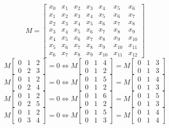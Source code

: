 $$ M = \left[\begin{matrix}x_{0} & x_{1} & x_{2} & x_{3} & x_{4} & x_{5} & x_{6}\\x_{1} & x_{2} & x_{3} & x_{4} & x_{5} & x_{6} & x_{7}\\x_{2} & x_{3} & x_{4} & x_{5} & x_{6} & x_{7} & x_{8}\\x_{3} & x_{4} & x_{5} & x_{6} & x_{7} & x_{8} & x_{9}\\x_{4} & x_{5} & x_{6} & x_{7} & x_{8} & x_{9} & x_{10}\\x_{5} & x_{6} & x_{7} & x_{8} & x_{9} & x_{10} & x_{11}\\x_{6} & x_{7} & x_{8} & x_{9} & x_{10} & x_{11} & x_{12}\end{matrix}\right] $$
$$ M\left[\begin{matrix}0 & 1 & 2\\0 & 2 & 3\end{matrix}\right] = 0 \Leftrightarrow M\left[\begin{matrix}0 & 1 & 4\\0 & 1 & 2\end{matrix}\right] = M\left[\begin{matrix}0 & 1 & 3\\0 & 1 & 3\end{matrix}\right] $$
$$ M\left[\begin{matrix}0 & 1 & 2\\0 & 2 & 4\end{matrix}\right] = 0 \Leftrightarrow M\left[\begin{matrix}0 & 1 & 5\\0 & 1 & 2\end{matrix}\right] = M\left[\begin{matrix}0 & 1 & 4\\0 & 1 & 3\end{matrix}\right] $$
$$ M\left[\begin{matrix}0 & 1 & 2\\0 & 2 & 5\end{matrix}\right] = 0 \Leftrightarrow M\left[\begin{matrix}0 & 1 & 6\\0 & 1 & 2\end{matrix}\right] = M\left[\begin{matrix}0 & 1 & 5\\0 & 1 & 3\end{matrix}\right] $$
$$ M\left[\begin{matrix}0 & 1 & 2\\0 & 3 & 4\end{matrix}\right] = 0 \Leftrightarrow M\left[\begin{matrix}0 & 1 & 5\\0 & 1 & 3\end{matrix}\right] = M\left[\begin{matrix}0 & 1 & 4\\0 & 1 & 4\end{matrix}\right] $$
